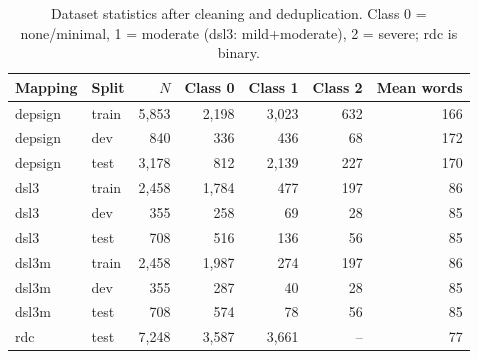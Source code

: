 \begin{table}[t]
\centering
\caption{Dataset statistics after cleaning and deduplication. Class 0 = none/minimal, 1 = moderate (dsl3: mild+moderate), 2 = severe; rdc is binary.}
\label{tab:data}
\begin{tabular}{llrrrrr}
\toprule
Mapping & Split & $N$ & Class 0 & Class 1 & Class 2 & Mean words \\
\midrule
depsign & train & 5,853 & 2,198 & 3,023 & 632 & 166 \\
depsign & dev & 840 & 336 & 436 & 68 & 172 \\
depsign & test & 3,178 & 812 & 2,139 & 227 & 170 \\
dsl3 & train & 2,458 & 1,784 & 477 & 197 & 86 \\
dsl3 & dev & 355 & 258 & 69 & 28 & 85 \\
dsl3 & test & 708 & 516 & 136 & 56 & 85 \\
dsl3m & train & 2,458 & 1,987 & 274 & 197 & 86 \\
dsl3m & dev & 355 & 287 & 40 & 28 & 85 \\
dsl3m & test & 708 & 574 & 78 & 56 & 85 \\
rdc & test & 7,248 & 3,587 & 3,661 & -- & 77 \\
\bottomrule
\end{tabular}
\end{table}
